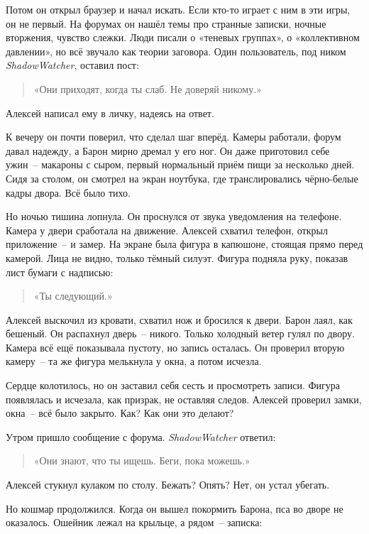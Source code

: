 \documentclass[12pt,a4paper]{book}
\begin{document}
Потом он открыл браузер и начал искать. Если кто-то играет с ним в эти игры, он не первый. На форумах он нашёл темы про странные записки, ночные вторжения, чувство слежки. Люди писали о «теневых группах», о «коллективном давлении», но всё звучало как теории заговора. Один пользователь, под ником \textit{ShadowWatcher}, оставил пост:

\begin{quote}
«Они приходят, когда ты слаб. Не доверяй никому.»
\end{quote}

Алексей написал ему в личку, надеясь на ответ.

К вечеру он почти поверил, что сделал шаг вперёд. Камеры работали, форум давал надежду, а Барон мирно дремал у его ног. Он даже приготовил себе ужин~-- макароны с сыром, первый нормальный приём пищи за несколько дней. Сидя за столом, он смотрел на экран ноутбука, где транслировались чёрно-белые кадры двора. Всё было тихо.

Но ночью тишина лопнула. Он проснулся от звука уведомления на телефоне. Камера у двери сработала на движение. Алексей схватил телефон, открыл приложение~-- и замер. На экране была фигура в капюшоне, стоящая прямо перед камерой. Лица не видно, только тёмный силуэт. Фигура подняла руку, показав лист бумаги с надписью:

\begin{quote}
«Ты следующий.»
\end{quote}

Алексей выскочил из кровати, схватил нож и бросился к двери. Барон лаял, как бешеный. Он распахнул дверь~-- никого. Только холодный ветер гулял по двору. Камера всё ещё показывала пустоту, но запись осталась. Он проверил вторую камеру~-- та же фигура мелькнула у окна, а потом исчезла.

Сердце колотилось, но он заставил себя сесть и просмотреть записи. Фигура появлялась и исчезала, как призрак, не оставляя следов. Алексей проверил замки, окна~-- всё было закрыто. Как? Как они это делают?

Утром пришло сообщение с форума. \textit{ShadowWatcher} ответил:

\begin{quote}
«Они знают, что ты ищешь. Беги, пока можешь.»
\end{quote}

Алексей стукнул кулаком по столу. Бежать? Опять? Нет, он устал убегать.

Но кошмар продолжился. Когда он вышел покормить Барона, пса во дворе не оказалось. Ошейник лежал на крыльце, а рядом~-- записка:
\end{document}
